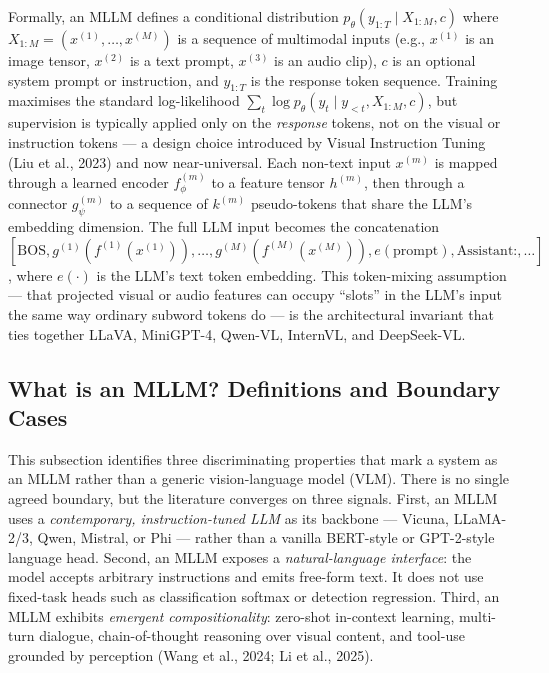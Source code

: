 Formally, an MLLM defines a conditional distribution \(p_\theta(y_{1:T} \mid X_{1:M}, c)\) where \(X_{1:M} = (x^{(1)}, \ldots, x^{(M)})\) is a sequence of multimodal inputs (e.g., \(x^{(1)}\) is an image tensor, \(x^{(2)}\) is a text prompt, \(x^{(3)}\) is an audio clip), \(c\) is an optional system prompt or instruction, and \(y_{1:T}\) is the response token sequence. Training maximises the standard log-likelihood \(\sum_t \log p_\theta(y_t \mid y_{<t}, X_{1:M}, c)\), but supervision is typically applied only on the \emph{response} tokens, not on the visual or instruction tokens --- a design choice introduced by Visual Instruction Tuning (Liu et al., 2023) and now near-universal. Each non-text input \(x^{(m)}\) is mapped through a learned encoder \(f^{(m)}_\phi\) to a feature tensor \(h^{(m)}\), then through a connector \(g^{(m)}_\psi\) to a sequence of \(k^{(m)}\) pseudo-tokens that share the LLM's embedding dimension. The full LLM input becomes the concatenation \([\text{BOS}, g^{(1)}(f^{(1)}(x^{(1)})), \ldots, g^{(M)}(f^{(M)}(x^{(M)})), e(\text{prompt}), \text{Assistant:}, \ldots]\), where \(e(\cdot)\) is the LLM's text token embedding. This token-mixing assumption --- that projected visual or audio features can occupy ``slots'' in the LLM's input the same way ordinary subword tokens do --- is the architectural invariant that ties together LLaVA, MiniGPT-4, Qwen-VL, InternVL, and DeepSeek-VL.

\subsection{What is an MLLM? Definitions and Boundary Cases}\label{what-is-an-mllm-definitions-and-boundary-cases}

This subsection identifies three discriminating properties that mark a system as an MLLM rather than a generic vision-language model (VLM). There is no single agreed boundary, but the literature converges on three signals. First, an MLLM uses a \emph{contemporary, instruction-tuned LLM} as its backbone --- Vicuna, LLaMA-2/3, Qwen, Mistral, or Phi --- rather than a vanilla BERT-style or GPT-2-style language head. Second, an MLLM exposes a \emph{natural-language interface}: the model accepts arbitrary instructions and emits free-form text. It does not use fixed-task heads such as classification softmax or detection regression. Third, an MLLM exhibits \emph{emergent compositionality}: zero-shot in-context learning, multi-turn dialogue, chain-of-thought reasoning over visual content, and tool-use grounded by perception (Wang et al., 2024; Li et al., 2025).

